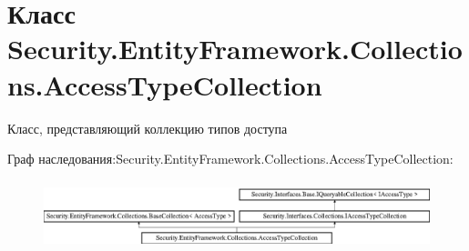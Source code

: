\hypertarget{class_security_1_1_entity_framework_1_1_collections_1_1_access_type_collection}{}\section{Класс Security.\+Entity\+Framework.\+Collections.\+Access\+Type\+Collection}
\label{class_security_1_1_entity_framework_1_1_collections_1_1_access_type_collection}


Класс, представляющий коллекцию типов доступа  


Граф наследования\+:Security.\+Entity\+Framework.\+Collections.\+Access\+Type\+Collection\+:\begin{figure}[H]
\begin{center}
\leavevmode
\includegraphics[height=2.033898cm]{da/d93/class_security_1_1_entity_framework_1_1_collections_1_1_access_type_collection}
\end{center}
\end{figure}
